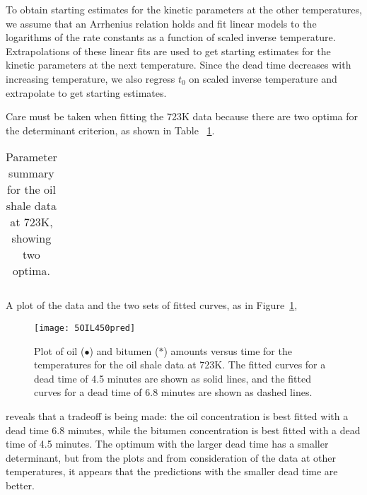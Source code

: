 To obtain starting estimates for the kinetic parameters at the other
temperatures, we assume that an Arrhenius relation holds and
fit linear models to the logarithms of the rate constants
as a function of scaled inverse temperature.
Extrapolations of these linear fits are used to get starting
estimates for the kinetic parameters at the next temperature.
Since the dead time decreases with increasing temperature, we also
regress $t_{0}$ on scaled inverse temperature and extrapolate
to get starting estimates.

Care must be taken when fitting
the 723K data because there are two optima for the determinant
criterion, as shown in
Table~ \ref{tbl:450opt}.
\begin{table}
  \caption{\label{tbl:450opt}
  Parameter summary for the oil shale data at 723K, showing two optima.
  }
  \begin{tabular}{l r r r r r}
  \end{tabular}
\end{table}
A plot of the data and the two sets of fitted curves, as in
Figure~\ref{fig:OIL450pred},
\begin{figure}
  \centerline{\texttt{[image: 5OIL450pred]}}%
  \caption{\label{fig:OIL450pred}
  Plot of oil ($\bullet$) and bitumen ($*$) amounts versus time for the
  temperatures for the oil shale data at 723K.
  The fitted curves for a dead time of 4.5 minutes are shown as solid
  lines, and the fitted curves for a dead time of 6.8 minutes are shown as
  dashed lines.
  }
\end{figure}
reveals that a tradeoff is being made:
the oil concentration is best fitted with a dead time 6.8
minutes, while the bitumen concentration is best fitted with a
dead time of 4.5 minutes.
The optimum with the larger dead time has a smaller
determinant, but from the plots and from consideration of the
data at other temperatures, it appears that the predictions
with the smaller dead time are better.

